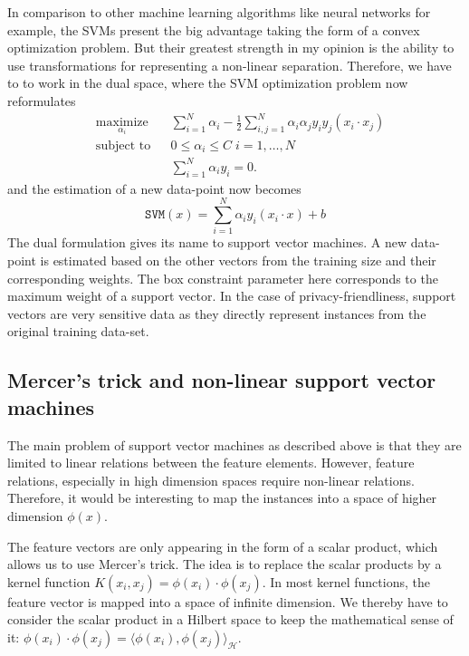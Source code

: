 In comparison to other machine learning algorithms like neural networks for example, the SVMs present the big advantage taking the form of a convex optimization problem. But their greatest strength in my opinion is the ability to use transformations for representing a non-linear separation. Therefore, we have to to work in the dual space, where the SVM optimization problem now reformulates
\begin{equation}
    \begin{aligned}
& \underset{\alpha_i}{\text{maximize}} 
& & \sum_{i=1}^N \alpha_i - \frac12 \sum_{i,j=1}^N \alpha_i \alpha_j y_i y_j (x_i \cdot x_j) \\
& \text{subject to}
& & 0 \leq \alpha_i \leq C \; i = 1, \ldots, N \\
& 
& & \sum_{i=1}^N\alpha_i y_i = 0.
\end{aligned}
\end{equation}
and the estimation of a new data-point now becomes
\begin{equation}
    \mathtt{SVM}(x) = \sum_{i=1}^N \alpha_i y_i (x_i \cdot x) + b
\end{equation}
The dual formulation gives its name to support vector machines. A new data-point is estimated based on the other vectors from the training size and their corresponding weights. The box constraint parameter here corresponds to the maximum weight of a support vector. In the case of privacy-friendliness, support vectors are very sensitive data as they directly represent instances from the original training data-set.

\subsection{Mercer's trick and non-linear support vector machines}
The main problem of support vector machines as described above is that they are limited to linear relations between the feature elements. However, feature relations, especially in high dimension spaces require non-linear relations. Therefore, it would be interesting to map the instances into a space of higher dimension $\phi(x)$.

The feature vectors are only appearing in the form of a scalar product, which allows us to use Mercer's trick. The idea is to replace the scalar products by a kernel function $K(x_i,x_j) = \phi(x_i) \cdot \phi(x_j)$. In most kernel functions, the feature vector is mapped into a space of infinite dimension. We thereby have to consider the scalar product in a Hilbert space to keep the mathematical sense of it: $\phi(x_i) \cdot \phi(x_j) = \langle \phi(x_i), \phi(x_j) \rangle_{\mathcal{H}}$.

